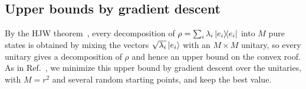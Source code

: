 \documentclass[aps,pra,twocolumn,superscriptaddress]{revtex4-2}
\begin{document}
\begin{widetext}
\subsection{Upper bounds by gradient descent}\label{app:HJW}
By the HJW theorem~\cite{HJW}, every decomposition of $\rho=\sum_i\lambda_i\dyad{e_i}$
into $M$ pure states is obtained
by mixing the vectors $\sqrt{\lambda_i}\ket{e_i}$ with an $M\times M$ unitary, so every unitary gives a decomposition of
$\rho$ and hence an upper bound on the convex roof. As in Ref.~\cite{Rothlisberger2009}, we minimize this upper bound by
gradient descent over the unitaries, with $M=r^2$ and several random starting points, and keep the best value.



\end{widetext}
\end{document}
